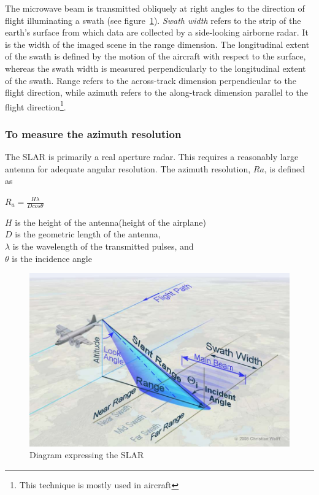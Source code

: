 The microwave beam is transmitted obliquely at right angles to the direction of flight illuminating a swath (see figure~\ref{fig:slar2}). \textit{Swath width} refers to the strip of the earth's surface from which data are collected by a side-looking airborne radar. It is the width of the imaged scene in the range dimension. The longitudinal extent of the swath is defined by the motion of the aircraft with respect to the surface, whereas the swath width is measured perpendicularly to the longitudinal extent of the swath. Range refers to the across-track dimension perpendicular to the flight direction, while azimuth refers to the along-track dimension parallel to the flight direction\footnote{This technique is mostly used in aircraft}.

\subsubsection*{To measure the azimuth resolution}
The SLAR is primarily a real aperture radar. This requires a reasonably large antenna for adequate angular resolution. The azimuth resolution, $ Ra $, is defined as

\begin{center}
$R_{a}=\frac{H \lambda}{D cos\theta}$
\end{center}
$ H $ is the height of the antenna(height of the airplane)\\
$ D $ is the geometric length of the antenna,\\
$\lambda$ is the wavelength of the transmitted pulses, and\\
$\theta$ is the incidence angle

\begin{figure}[h]
\centering
\includegraphics[scale=0.2]{./graphics/SLAR2}
\caption{Diagram expressing the SLAR}
\label{fig:slar2}
\end{figure}


